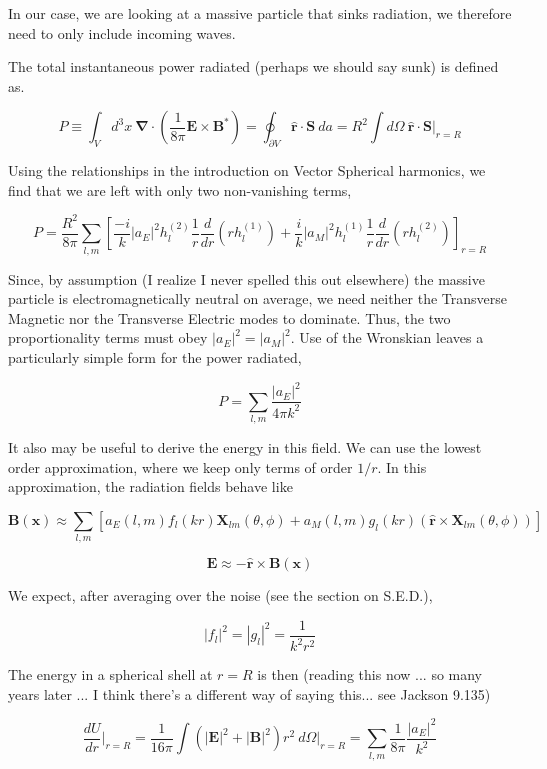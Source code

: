 \documentclass {article}
\renewcommand\vec{\mathbf}
\let\OldS\nabla
\renewcommand{\nabla}{\boldsymbol{\OldS}}
\let\OldHat\hat
\renewcommand{\hat}[1]{\OldHat{\mathbf{#1}}}
\begin{document}
In our case, we are looking at a massive particle that sinks radiation, we therefore need to only include incoming waves.

The total instantaneous power radiated (perhaps we should say sunk) is defined as.

$$P \equiv \int_V d^3x ~ \nabla \cdot \left( \frac 1 {8 \pi} \vec E \times \vec B^*\right) = \oint_{\partial V} \hat r \cdot \vec S ~ da = R^2 \int d\Omega ~ \hat r \cdot \vec S \bigg|_{r = R}$$

Using the relationships in the introduction on Vector Spherical harmonics, we find that we are left with only two non-vanishing terms,

$$P = \frac {R^2}{8 \pi} \sum_{l, m} \left[  \frac {-i} k |a_E|^2 h_l^{(2)} \frac 1 r \frac d {dr} \left( rh_l^{(1)} \right) + \frac i k |a_M|^2 h_l^{(1)} \frac 1 r \frac d {dr} \left( rh_l^{(2)}\right) \right]_{r=R}$$

Since, by assumption (I realize I never spelled this out elsewhere) the massive particle is electromagnetically neutral on average, we need neither the Transverse Magnetic nor the Transverse Electric modes to dominate. Thus, the two proportionality terms must obey $|a_E|^2 = |a_M|^2$. Use of the Wronskian leaves a particularly simple form for the power radiated,

$$P = \sum_{l,m} \frac {|a_E|^2} { 4 \pi k^2}$$

It also may be useful to derive the energy in this field. We can use the lowest order approximation, where we keep only terms of order $1/r$. In this approximation, the radiation fields behave like

$$\vec B (\vec x) \approx \sum_{l,m} \left[ a_E (l,m) f_l (kr) \vec X_{lm} (\theta, \phi) + a_M (l, m) g_l (kr) \left( \hat r \times \vec X_{lm} (\theta, \phi)  \right) \right]$$

$$ \vec E \approx - \hat r \times \vec B(\vec x) $$

We expect, after averaging over the noise (see the section on S.E.D.), 

$$|f_l|^2 = |g_l|^2 =  \frac 1 {k^2 r^2}$$

The energy in a spherical shell at $r =R$ is then (reading this now ... so many years later ... I think there's a different way of saying this... see Jackson 9.135)

$$\frac {dU} {dr} \bigg|_{r=R} = \frac 1 {16 \pi} \int \left( |\vec E  |^2 + |\vec B |^2 \right) r^2 ~ d\Omega  \bigg|_{r=R} = \sum_{l, m} \frac 1 {8 \pi} \frac {|a_E|^2}{k^2}$$
\end{document}
